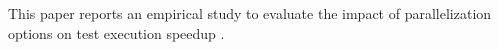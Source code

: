 This paper reports an empirical study to evaluate the impact of
parallelization options on test execution speedup  .

